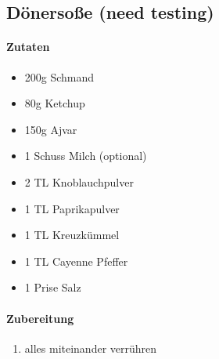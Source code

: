 \newpage
\subsection{Dönersoße (need testing)}
\paragraph{Zutaten}
\begin{itemize}[noitemsep]
	\item 200g Schmand
	\item 80g Ketchup 
	\item 150g Ajvar
	\item 1 Schuss Milch (optional)
	\item 2 TL Knoblauchpulver
	\item 1 TL Paprikapulver
	\item 1 TL Kreuzkümmel
	\item 1 TL Cayenne Pfeffer
	\item 1 Prise Salz
\end{itemize}
\paragraph{Zubereitung}
\begin{enumerate}[noitemsep]
	\item alles miteinander verrühren
\end{enumerate}